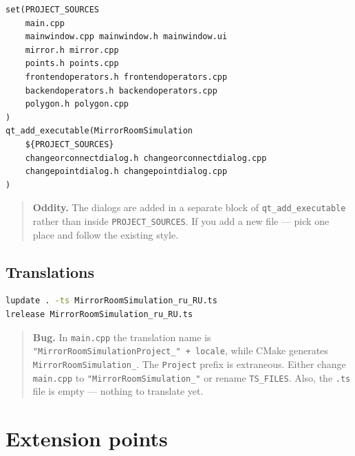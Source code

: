\documentclass[a4paper,11pt]{article}
\newcommand{\file}[1]{\texttt{#1}}
\newcommand{\code}[1]{\texttt{#1}}
\begin{document}
\begin{lstlisting}[caption={CMakeLists.txt, fragment}]
set(PROJECT_SOURCES
    main.cpp
    mainwindow.cpp mainwindow.h mainwindow.ui
    mirror.h mirror.cpp
    points.h points.cpp
    frontendoperators.h frontendoperators.cpp
    backendoperators.h backendoperators.cpp
    polygon.h polygon.cpp
)
qt_add_executable(MirrorRoomSimulation
    ${PROJECT_SOURCES}
    changeorconnectdialog.h changeorconnectdialog.cpp
    changepointdialog.h changepointdialog.cpp
)
\end{lstlisting}

\begin{quote}
\textbf{Oddity.} The dialogs are added in a separate block of
\code{qt\_add\_executable} rather than inside \code{PROJECT\_SOURCES}.
If you add a new file — pick one place and follow the existing style.
\end{quote}

\subsection{Translations}

\begin{lstlisting}[language=bash]
lupdate . -ts MirrorRoomSimulation_ru_RU.ts
lrelease MirrorRoomSimulation_ru_RU.ts
\end{lstlisting}

\begin{quote}
\textbf{Bug.} In \file{main.cpp} the translation name is
\code{"MirrorRoomSimulationProject\_" + locale}, while CMake generates
\code{MirrorRoomSimulation\_}. The \code{Project} prefix is extraneous.
Either change \file{main.cpp} to \code{"MirrorRoomSimulation\_"} or
rename \code{TS\_FILES}. Also, the \file{.ts} file is empty — nothing
to translate yet.
\end{quote}

\section{Extension points}
\label{sec:extending}
\end{document}
